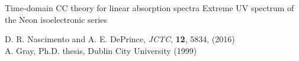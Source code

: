 \documentclass{beamer}
\begin{document}
\begin{frame}{Time-domain CC theory for linear absorption spectra}
 Extreme UV spectrum of the Neon isoelectronic series

 \begin{center}
 \end{center}
 \footnotesize{D. R. Nascimento and A. E. DePrince, {\it JCTC}, {\bf 12}, 5834, (2016) }\\
 \footnotesize{A. Gray, Ph.D. thesis, Dublin City University (1999)} 
\end{frame}
\end{document}
